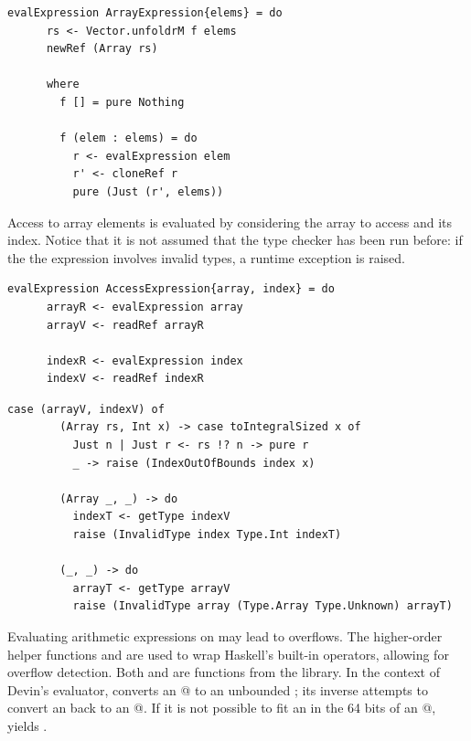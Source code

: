 \documentclass[UdineBachThesis,american,11pt]{PhdThesis}
\begin{document}
  \begin{lstlisting}[gobble=4,basicstyle=\ttfamily\small]
    evalExpression ArrayExpression{elems} = do
      rs <- Vector.unfoldrM f elems
      newRef (Array rs)

      where
        f [] = pure Nothing

        f (elem : elems) = do
          r <- evalExpression elem
          r' <- cloneRef r
          pure (Just (r', elems))
  \end{lstlisting}

  Access to array elements is evaluated by considering the array to access and
  its index. Notice that it is not assumed that the type checker has been run
  before: if the the expression involves invalid types, a runtime exception is
  raised.

  \begin{lstlisting}[gobble=4,basicstyle=\ttfamily\small]
    evalExpression AccessExpression{array, index} = do
      arrayR <- evalExpression array
      arrayV <- readRef arrayR

      indexR <- evalExpression index
      indexV <- readRef indexR
  \end{lstlisting}

  \newpage

  \begin{lstlisting}[gobble=4,basicstyle=\ttfamily\small]
      case (arrayV, indexV) of
        (Array rs, Int x) -> case toIntegralSized x of
          Just n | Just r <- rs !? n -> pure r
          _ -> raise (IndexOutOfBounds index x)

        (Array _, _) -> do
          indexT <- getType indexV
          raise (InvalidType index Type.Int indexT)

        (_, _) -> do
          arrayT <- getType arrayV
          raise (InvalidType array (Type.Array Type.Unknown) arrayT)
  \end{lstlisting}

  Evaluating arithmetic expressions on \lstinline@Int@s may lead to overflows.
  The higher-order helper functions \lstinline@safeUnary@ and
  \lstinline@safeBinary@ are used to wrap Haskell's built-in operators, allowing
  for overflow detection. Both \lstinline@toInteger@ and
  \lstinline@toIntegralSized@ are functions from the \lstinline@base@ library.
  In the context of Devin's evaluator, \lstinline@toInteger@ converts an
  @ to an unbounded \lstinline@Integer@; its inverse
  \lstinline@toIntegralSized@ attempts to convert an \lstinline@Integer@ back to
  an @. If it is not possible to fit an \lstinline@Integer@ in
  the 64 bits of an @, \lstinline@toIntegralSized@ yields
  \lstinline@Nothing@.
\end{document}
